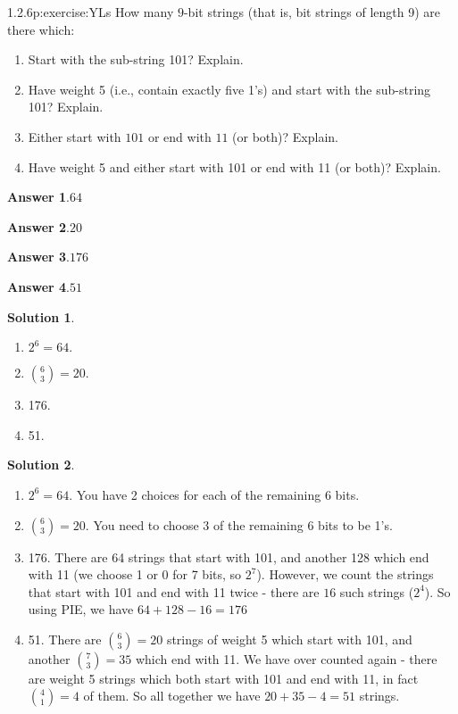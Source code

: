 \documentclass[twoside,11pt,]{book}
\newcommand{\blocktitlefont}{\relax}
\numberwithin{equation}{chapter}
\begin{document}
\begin{divisionsolution}{1.2.6}{}{p:exercise:YLs}%
How many \(9\)-bit strings (that is, bit strings of length 9) are there which:%
\begin{enumerate}[label=(\alph*)]
\item{}Start with the sub-string 101? Explain.%
\item{}Have weight 5 (i.e., contain exactly five 1's) and start with the sub-string 101? Explain.%
\item{}Either start with \(101\) or end with \(11\) (or both)? Explain.%
\item{}Have weight 5 and either start with 101 or end with 11 (or both)? Explain.%
\end{enumerate}
%
\par\smallskip%
\noindent\textbf{\blocktitlefont Answer 1}.\quad{}\(64\)%
\par\smallskip%
\noindent\textbf{\blocktitlefont Answer 2}.\quad{}\(20\)%
\par\smallskip%
\noindent\textbf{\blocktitlefont Answer 3}.\quad{}\(176\)%
\par\smallskip%
\noindent\textbf{\blocktitlefont Answer 4}.\quad{}\(51\)%
\par\smallskip%
\noindent\textbf{\blocktitlefont Solution 1}.\quad{}%
\begin{enumerate}[label=(\alph*)]
\item{}\(2^6 = 64\text{.}\)%
\item{}\({6 \choose 3} = 20\text{.}\)%
\item{}176.%
\item{}51.%
\end{enumerate}
%
\par\smallskip%
\noindent\textbf{\blocktitlefont Solution 2}.\quad{}%
\begin{enumerate}[label=(\alph*)]
\item{}\(2^6 = 64\text{.}\) You have 2 choices for each of the remaining 6 bits.%
\item{}\({6 \choose 3} = 20\text{.}\) You need to choose 3 of the remaining 6 bits to be 1's.%
\item{}176. There are 64 strings that start with 101, and another 128 which end with 11 (we choose 1 or 0 for 7 bits, so \(2^7\)). However, we count the strings that start with 101 and end with 11 twice - there are \(16\) such strings (\(2^4\)). So using PIE, we have \(64 + 128 - 16 = 176\)%
\item{}51. There are \({6 \choose 3} = 20\) strings of weight 5 which start with 101, and another \({7 \choose 3} = 35\) which end with 11. We have over counted again - there are weight 5 strings which both start with 101 and end with 11, in fact \({4 \choose 1} = 4\) of them. So all together we have \(20 + 35 - 4 = 51\) strings.%
\end{enumerate}
%
\end{divisionsolution}%
\end{document}
